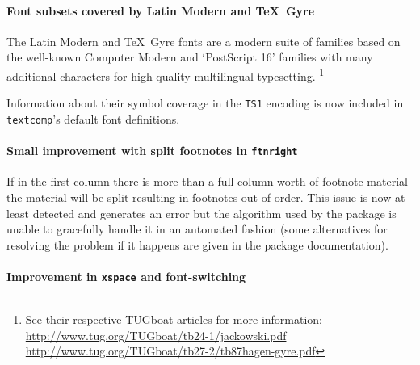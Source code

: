 \documentclass{ltnews}
\begin{document}
\paragraph{Font subsets covered by Latin Modern and \TeX\ Gyre}

The Latin Modern and \TeX\ Gyre fonts are a modern suite of families based
on the well-known Computer Modern and `PostScript 16' families with many additional
characters for high-quality multilingual typesetting.%
\footnote{%
  See their respective TUGboat articles for more information:\\
  \url{http://www.tug.org/TUGboat/tb24-1/jackowski.pdf}\\
  \url{http://www.tug.org/TUGboat/tb27-2/tb87hagen-gyre.pdf}%
}

Information about their symbol coverage in the \verb|TS1| encoding is now included
in \texttt{textcomp}'s default font definitions.



\paragraph{Small improvement with split footnotes in \texttt{ftnright}}

If in the first column there is more than a full column worth of footnote
material the material will be split resulting in footnotes out of
order. This issue is now at least detected and generates an error but the algorithm used by the package is
unable to gracefully handle it in an automated fashion (some alternatives for resolving the problem if it happens are given in the package documentation).

\paragraph{Improvement in \texttt{xspace} and font-switching}
\end{document}
